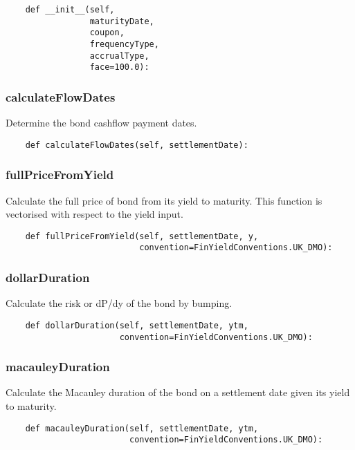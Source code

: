 \documentclass[twoside,11pt]{book}
\begin{document}
\begin{lstlisting}
    def __init__(self,
                 maturityDate,
                 coupon,
                 frequencyType,
                 accrualType,
                 face=100.0):
\end{lstlisting}

\subsubsection*{{\bf calculateFlowDates}}
Determine the bond cashflow payment dates.  

\begin{lstlisting}
    def calculateFlowDates(self, settlementDate):
\end{lstlisting}

\subsubsection*{{\bf fullPriceFromYield}}
Calculate the full price of bond from its yield to maturity. This function is vectorised with respect to the yield input.  

\begin{lstlisting}
    def fullPriceFromYield(self, settlementDate, y,
                           convention=FinYieldConventions.UK_DMO):
\end{lstlisting}

\subsubsection*{{\bf dollarDuration}}
Calculate the risk or dP/dy of the bond by bumping.  

\begin{lstlisting}
    def dollarDuration(self, settlementDate, ytm,
                       convention=FinYieldConventions.UK_DMO):
\end{lstlisting}

\subsubsection*{{\bf macauleyDuration}}
Calculate the Macauley duration of the bond on a settlement date given its yield to maturity.  

\begin{lstlisting}
    def macauleyDuration(self, settlementDate, ytm,
                         convention=FinYieldConventions.UK_DMO):
\end{lstlisting}
\end{document}
